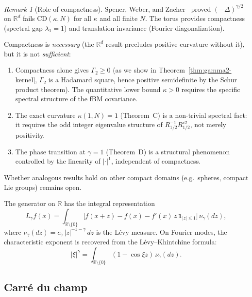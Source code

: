 \documentclass[11pt,a4paper]{article}
\theoremstyle{plain}
\theoremstyle{definition}
\theoremstyle{remark}
\newtheorem{remark}[theorem]{Remark}
\newcommand{\R}{\mathbb{R}}
\begin{document}
\begin{remark}[Role of compactness]\label{rem:compact}
Spener, Weber, and Zacher~\cite{SpenerWeberZacher2020} proved
$(-\Delta)^{\gamma/2}$ on $\R^d$ fails $\mathrm{CD}(\kappa,N)$
for all $\kappa$ and all finite $N$. The torus provides
compactness (spectral gap $\lambda_1 = 1$) and
translation-invariance (Fourier diagonalization).

Compactness is \emph{necessary} (the $\R^d$ result precludes
positive curvature without it), but it is not \emph{sufficient}:
\begin{enumerate}[label=(\roman*)]
\item Compactness alone gives $\Gamma_2 \geq 0$
  (as we show in Theorem~\ref{thm:gamma2-kernel},
  $\Gamma_2$ is a Hadamard square, hence positive semidefinite
  by the Schur product theorem).
  The quantitative lower bound $\kappa > 0$ requires the
  specific spectral structure of the fBM covariance.
\item The exact curvature $\kappa(1,N) = 1$ (Theorem~C) is
  a non-trivial spectral fact: it requires the odd integer
  eigenvalue structure of $R_{1/2}^{-1}R_{1/2}^{\circ 2}$,
  not merely positivity.
\item The phase transition at $\gamma = 1$ (Theorem~D) is a
  structural phenomenon controlled by the linearity of
  $|\cdot|^1$, independent of compactness.
\end{enumerate}
Whether analogous results hold on other compact domains
(e.g.\ spheres, compact Lie groups) remains open.
\end{remark}

The generator on $\R$ has the integral representation
\begin{equation}\label{eq:generator}
  L_\gamma f(x)
  = \int_{\R \setminus \{0\}}
  \bigl[f(x+z) - f(x) - f'(x)\,z\,\mathbf{1}_{|z| \leq 1}\bigr]
  \,\nu_\gamma(dz),
\end{equation}
where $\nu_\gamma(dz) = c_\gamma\,|z|^{-1-\gamma}\,dz$ is the
L\'evy measure.
On Fourier modes, the characteristic exponent is recovered from
the L\'evy--Khintchine formula:
\begin{equation}\label{eq:LK}
  |\xi|^\gamma
  = \int_{\R \setminus \{0\}}
  (1 - \cos \xi z)\,\nu_\gamma(dz).
\end{equation}


\subsection{Carr\'e du champ}
\end{document}

